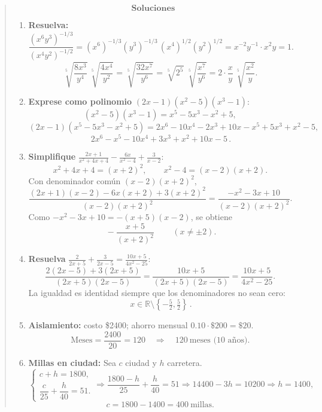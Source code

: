 \documentclass[]{article}
\title{}
\author{}
\begin{document}
\maketitle

\begin{abstract}

\[
\textbf{Soluciones}
\]

\begin{enumerate}
	\item \textbf{Resuelva:}
	\[
	\frac{(x^{6}y^{3})^{-1/3}}{(x^{4}y^{2})^{-1/2}}
	= (x^{6})^{-1/3}(y^{3})^{-1/3}\,(x^{4})^{1/2}(y^{2})^{1/2}
	= x^{-2}y^{-1}\cdot x^{2}y
	= 1.
	\]
	\[
	\sqrt[5]{\frac{8x^{3}}{y^{4}}}\,\sqrt[5]{\frac{4x^{4}}{y^{2}}}
	= \sqrt[5]{\frac{32x^{7}}{y^{6}}}
	= \sqrt[5]{2^{5}}\;\sqrt[5]{\frac{x^{7}}{y^{6}}}
	= 2\cdot \frac{x}{y}\,\sqrt[5]{\frac{x^{2}}{y}}.
	\]
	
	\item \textbf{Exprese como polinomio} \; $(2x-1)(x^2-5)(x^3-1)$:
	\[
	(x^2-5)(x^3-1)=x^5-5x^3-x^2+5,
	\]
	\[
	(2x-1)(x^5-5x^3-x^2+5)
	=2x^6-10x^4-2x^3+10x -x^5+5x^3+x^2-5,
	\]
	\[
	\boxed{\,2x^6-x^5-10x^4+3x^3+x^2+10x-5\,}.
	\]
	
	\item \textbf{Simplifique} \; $\displaystyle \frac{2x+1}{x^2+4x+4}-\frac{6x}{x^2-4}+\frac{3}{x-2}$:
	\[
	x^2+4x+4=(x+2)^2,\qquad x^2-4=(x-2)(x+2).
	\]
	Con denominador común $(x-2)(x+2)^2$,
	\[
	\frac{(2x+1)(x-2)-6x(x+2)+3(x+2)^2}{(x-2)(x+2)^2}
	=\frac{-x^2-3x+10}{(x-2)(x+2)^2}.
	\]
	Como $-x^2-3x+10=-(x+5)(x-2)$, se obtiene
	\[
	\boxed{\,-\dfrac{x+5}{(x+2)^2}\,}\qquad (x\ne \pm 2).
	\]
	
	\item \textbf{Resuelva} \; $\displaystyle \frac{2}{2x+5}+\frac{3}{2x-5}=\frac{10x+5}{4x^2-25}$:
	\[
	\frac{2(2x-5)+3(2x+5)}{(2x+5)(2x-5)}
	=\frac{10x+5}{(2x+5)(2x-5)}
	=\frac{10x+5}{4x^2-25}.
	\]
	La igualdad es identidad siempre que los denominadores no sean cero:
	\[
	\boxed{\,x\in\mathbb{R}\setminus\left\{-\tfrac{5}{2},\tfrac{5}{2}\right\}\,}.
	\]
	
	\item \textbf{Aislamiento:} costo \$2400; ahorro mensual $0.10\cdot\$200=\$20$.
	\[
	\text{Meses}=\frac{2400}{20}=120\quad\Rightarrow\quad \boxed{120\ \text{meses (10 años)}}.
	\]
	
	\item \textbf{Millas en ciudad:} Sea $c$ ciudad y $h$ carretera.
	\[
	\begin{cases}
		c+h=1800,\\[2pt]
		\dfrac{c}{25}+\dfrac{h}{40}=51.
	\end{cases}
	\Rightarrow \frac{1800-h}{25}+\frac{h}{40}=51
	\Rightarrow 14400-3h=10200
	\Rightarrow h=1400,
	\]
	\[
	\boxed{c=1800-1400=400\ \text{millas}}.
	\]
	

\end{enumerate}
\end{abstract}
\end{document}
